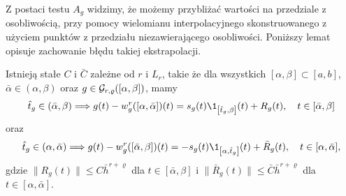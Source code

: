 \documentclass[oik, pdftex, robocza, man]{mgrwms}
\begin{document}
    Z postaci testu $A_{g}$ widzimy, że możemy przybliżać wartości na przedziale z osobliwością, przy pomocy wielomianu interpolacyjnego skonstruowanego z użyciem punktów z przedziału niezawierającego osobliwości. Poniższy lemat opisuje zachowanie błędu takiej ekstrapolacji.

    \begin{lemma} \label{lem:2:2014}
        Istnieją stałe $C$ i $\bar{C}$ zależne od $r$ i $L_{r}$, takie że dla wszystkich $[\alpha, \beta] \subset [a,b]$, $\bar{\alpha} \in (\alpha, \beta)$ oraz $g \in \mathcal{G}_{r,\varrho}([\alpha,\beta])$, mamy
        \begin{equation*}
            \hat{t}_{g} \in(\bar{\alpha}, \beta) \Longrightarrow g(t)-w_{g}^{r}([\alpha, \bar{\alpha}])(t)=s_{g}(t) \1_{\left[\hat{t}_{g}, \beta\right]}(t)+R_{g}(t), \quad t \in[\bar{\alpha}, \beta]
        \end{equation*}
        oraz
        \begin{equation*}
            \hat{t}_{g} \in (\alpha,\bar{\alpha}) \Longrightarrow g(t)-w_{g}^{r}([\bar{\alpha}, \beta])(t)= -s_{g}(t) \1_{\left[\alpha,\hat{t}_{g}\right]}(t)+\bar{R}_{g}(t), \quad t \in[\alpha,\bar{\alpha}],
        \end{equation*}
        gdzie $\| R_{g}(t) \| \leq C\bar{h}^{r+\varrho}$ dla $t \in [\bar{\alpha}, \beta]$ i $\| \bar{R}_{g}(t) \| \leq \bar{C}\bar{h}^{r+\varrho}$ dla $t \in [\alpha,\bar{\alpha}]$.
    \end{lemma}
\end{document}
